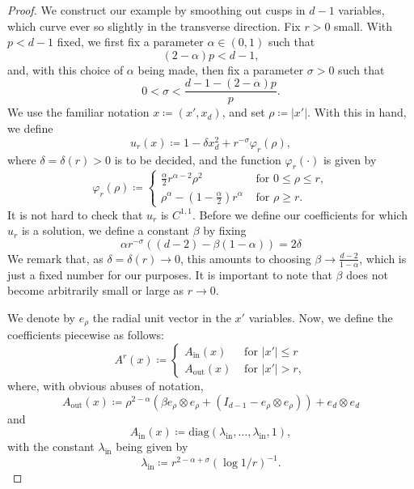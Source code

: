 \documentclass[10pt,a4paper]{amsart}
\newcommand{\ds}{\displaystyle}
\newcommand{\vphi}{\varphi}
\begin{document}
\begin{proof}
We construct our example by smoothing out cusps in $d-1$ variables, which curve ever so slightly in the transverse direction. Fix $r>0$ small. With $p<d-1$ fixed, we first fix a parameter $\alpha \in (0,1)$ such that 
\begin{equation}\label{eq: alphaeq} (2-\alpha)p < d-1,
\end{equation}
and, with this choice of $\alpha$ being made, then fix a parameter $\sigma>0$ such that
\begin{equation}
    \label{eq: sigmaeq}
    0<\sigma < \frac{d-1 - (2-\alpha)p}{p}.
\end{equation}
We use the familiar notation $x\coloneqq (x', x_d)$, and set $\rho \coloneqq |x'|$. With this in hand, we define
$$u_{r}(x) \coloneqq 1-\delta x_d^2 + r^{-\sigma} \vphi_r(\rho),$$
where $\delta = \delta(r)>0$ is to be decided, and the function $\vphi_r(\cdot)$ is given by 
$$\vphi_r(\rho) \coloneqq \begin{cases}
    \frac\alpha2 r^{\alpha -2} \rho^2 & \text{ for }  0 \le \rho \le r,\\
    \rho^\alpha - \left(1-\frac\alpha2\right)r^\alpha & \text{ for } \rho \ge r.
\end{cases}$$
It is not hard to check that $u_r$ is $C^{1,1}$. Before we define our coefficients for which $u_r$ is a solution, we define a constant $\beta$ by fixing
\begin{equation}
\label{eq: betaeq}
    \alpha r^{-\sigma}((d-2) -\beta(1-\alpha)) = 2\delta
\end{equation}
We remark that, as $\delta = \delta(r) \to 0$, this amounts to choosing $\beta \to \frac{d-2}{1-\alpha}$, which is just a fixed number for our purposes. It is important to note that $\beta$ does not become arbitrarily small or large as $r\to 0$. 

We denote by $e_\rho$ the radial unit vector in the $x'$ variables. Now, we define the coefficients piecewise as follows:
$$A^r(x)\coloneqq \begin{cases} A_{\text{in}}(x) & \text{ for } |x'| \le r\\
A_{\text{out}}(x) & \text{ for } |x'|>r,
\end{cases}$$
where, with obvious abuses of notation,
$$A_{\text{out}}(x) \coloneqq \rho^{2-\alpha}\left(\beta e_\rho\otimes e_\rho + (I_{d-1} - e_\rho \otimes e_\rho)\right) + e_d \otimes e_d$$
and
$$A_{\text{in}}(x) \coloneqq 
\text{diag}(\lambda_{\text{in}}, \ldots, \lambda_{\text{in}}, 1),$$
with the constant $\lambda_{\text{in}}$ being given by 
$$\lambda_{\text{in}} \coloneq \ds r^{2-\alpha +\sigma}(\log 1/r)^{-1}.$$


\end{proof}
\end{document}
